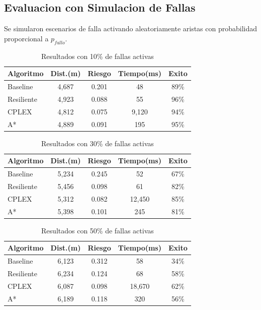 \documentclass[conference]{IEEEtran}
\begin{document}
\subsection{Evaluacion con Simulacion de Fallas}

Se simularon escenarios de falla activando aleatoriamente aristas con probabilidad proporcional a $p_{fallo}$.

\begin{table}[!t]
\centering
\caption{Resultados con 10\% de fallas activas}
\begin{tabular}{@{}lcccc@{}}
\toprule
\textbf{Algoritmo} & \textbf{Dist.(m)} & \textbf{Riesgo} & \textbf{Tiempo(ms)} & \textbf{Exito} \\
\midrule
Baseline & 4,687 & 0.201 & 48 & 89\% \\
Resiliente & 4,923 & 0.088 & 55 & 96\% \\
CPLEX & 4,812 & 0.075 & 9,120 & 94\% \\
A* & 4,889 & 0.091 & 195 & 95\% \\
\bottomrule
\end{tabular}
\end{table}

\begin{table}[!t]
\centering
\caption{Resultados con 30\% de fallas activas}
\begin{tabular}{@{}lcccc@{}}
\toprule
\textbf{Algoritmo} & \textbf{Dist.(m)} & \textbf{Riesgo} & \textbf{Tiempo(ms)} & \textbf{Exito} \\
\midrule
Baseline & 5,234 & 0.245 & 52 & 67\% \\
Resiliente & 5,456 & 0.098 & 61 & 82\% \\
CPLEX & 5,312 & 0.082 & 12,450 & 85\% \\
A* & 5,398 & 0.101 & 245 & 81\% \\
\bottomrule
\end{tabular}
\end{table}

\begin{table}[!t]
\centering
\caption{Resultados con 50\% de fallas activas}
\begin{tabular}{@{}lcccc@{}}
\toprule
\textbf{Algoritmo} & \textbf{Dist.(m)} & \textbf{Riesgo} & \textbf{Tiempo(ms)} & \textbf{Exito} \\
\midrule
Baseline & 6,123 & 0.312 & 58 & 34\% \\
Resiliente & 6,234 & 0.124 & 68 & 58\% \\
CPLEX & 6,087 & 0.098 & 18,670 & 62\% \\
A* & 6,189 & 0.118 & 320 & 56\% \\
\bottomrule
\end{tabular}
\end{table}
\end{document}
